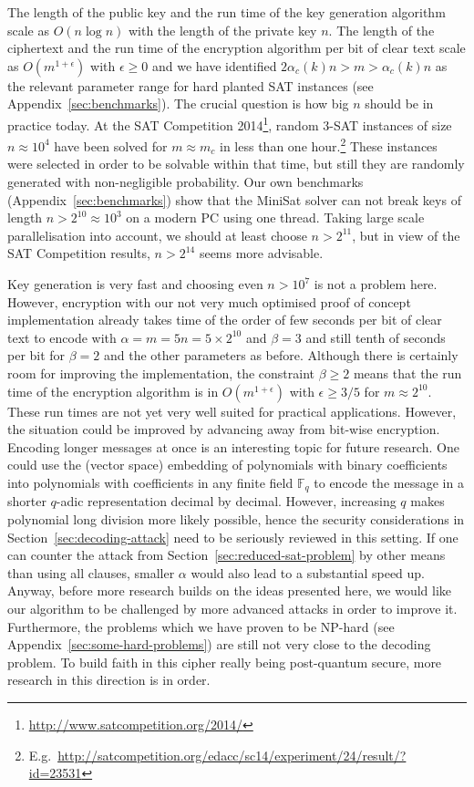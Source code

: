\documentclass[final,journal,compsoc]{IEEEtran}
\begin{document}
The length of the public key and the run time of the key
generation algorithm scale as $O(n \log n)$ with the length of the
private key $n$. The length of the ciphertext and the run time of the
encryption algorithm per bit of clear text scale as
$O(m^{1+\epsilon})$ with $\epsilon\geq 0$ and we have identified
$2\alpha_c(k) n > m
> \alpha_c(k) n$ as the relevant parameter range for hard planted SAT
instances (see Appendix~\ref{sec:benchmarks}). The crucial
question is how big $n$ should be in practice today.  At the SAT
Competition 2014\footnote{\url{http://www.satcompetition.org/2014/}},
random $3$-SAT instances of size $n\approx 10^4$ have been solved for
$m\approx m_c$ in less than one
hour.\footnote{E.g.~\url{http://satcompetition.org/edacc/sc14/experiment/24/result/?id=23531}}
These instances were selected in order to be solvable within that
time, but still they are randomly generated with non-negligible
probability.  
Our own benchmarks
(Appendix~\ref{sec:benchmarks}) show that the MiniSat
solver \cite{minisat} can not break keys of
length $n > 2^{10}\approx 10^3$ on a modern PC using one
thread. Taking large scale parallelisation into account, we should at
least choose $n > 2^{11}$, but in view of the SAT
Competition results, $n > 2^{14}$ seems more advisable.


Key generation is very fast and choosing even $n > 10^7$ is not a
problem here. However, encryption with our not very much optimised
proof of concept implementation \cite{code} already takes time of the
order of few seconds per bit of clear text to encode with $\alpha=m=5n
= 5 \times 2^{10}$ and $\beta=3$ and still tenth of seconds per bit
for $\beta=2$ and the other parameters as before.  Although there is
certainly room for improving the implementation, the constraint
$\beta\geq 2$ means that the run time of the encryption algorithm is
in $O(m^{1+\epsilon})$ with $\epsilon \geq 3/5$ for $m\approx 2^{10}$.
These run times are not yet very well suited for practical
applications.  However, the situation could be improved by advancing
away from bit-wise encryption.  Encoding longer messages at once is an
interesting topic for future research. One could use the (vector
space) embedding of polynomials with binary coefficients into
polynomials with coefficients in any finite field $\mathbb F_q$ to
encode the message in a shorter $q$-adic representation decimal by
decimal. However, increasing $q$ makes polynomial long division more
likely possible, hence the security considerations in
Section~\ref{sec:decoding-attack} need to be seriously reviewed in
this setting.  If one can counter the attack from
Section~\ref{sec:reduced-sat-problem} by other means than using all
clauses, smaller $\alpha$ would also lead to a substantial speed
up. Anyway, before more research builds on the ideas presented here,
we would like our algorithm to be challenged by more advanced attacks
in order to improve it. Furthermore, the problems which we have proven
to be NP-hard (see Appendix~\ref{sec:some-hard-problems}) are still
not very close to the decoding problem. To build faith in this
cipher really being post-quantum secure, more research in this
direction is in order.
\end{document}
